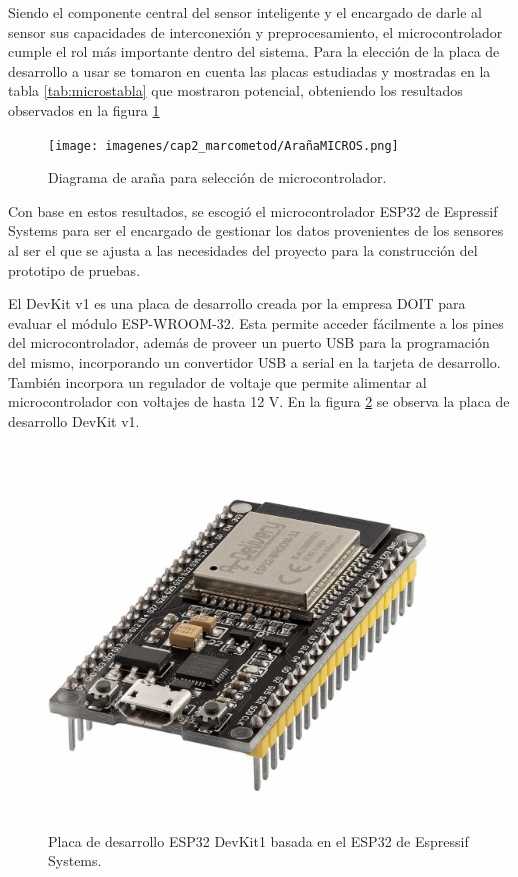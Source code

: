 Siendo el componente central del sensor inteligente y el encargado de darle al sensor sus capacidades de interconexión y preprocesamiento, el microcontrolador cumple el rol más importante dentro del sistema. Para la elección de la placa de desarrollo a usar se tomaron en cuenta las placas estudiadas y mostradas en la tabla \ref{tab:microstabla} que mostraron potencial, obteniendo los resultados observados en la figura \ref{fig:arañamcu}

\begin{figure}[H]
    \centering
    \texttt{[image: imagenes/cap2\_marcometod/ArañaMICROS.png]}
    \caption{Diagrama de araña para selección de microcontrolador.}
    \label{fig:arañamcu}
\end{figure}

Con base en estos resultados, se escogió el microcontrolador ESP32 de Espressif Systems para ser el encargado de gestionar los datos provenientes de los sensores al ser el que se ajusta a las necesidades del proyecto para la construcción del prototipo de pruebas.

El  DevKit v1 es una placa de desarrollo creada por la empresa DOIT para evaluar el módulo ESP-WROOM-32. Esta permite acceder fácilmente a los pines del microcontrolador, además de proveer un puerto USB para la programación del mismo, incorporando un convertidor USB a serial en la tarjeta de desarrollo. También incorpora un regulador de voltaje que permite alimentar al microcontrolador con voltajes de hasta 12 V. En la figura \ref{fig:esp32} se observa la placa de desarrollo DevKit v1.

\begin{figure}[H]
    \centering
    \includegraphics[width = 0.9\textwidth]{imagenes/cap2_marcometod/esp32.jpg}
    \caption{Placa de desarrollo ESP32 DevKit1 basada en el ESP32 de Espressif Systems.}
    \label{fig:esp32}
\end{figure}


